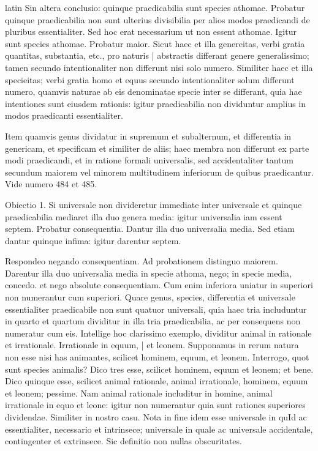\begin{otherlanguage*}{latin}
\pstart
  Sin altera conclusio: quinque praedicabilia sunt species athomae. Probatur quinque praedicabilia non sunt ulterius divisibilia per alios modos praedicandi de pluribus essentialiter. Sed hoc erat necessarium ut non essent athomae. Igitur sunt species athomae. Probatur maior. Sicut haec et illa genereitas, verbi gratia quantitas, substantia, etc., pro naturis \textnormal{|}   abstractis differant genere generalissimo; tamen secundo intentionaliter non differunt nisi solo numero. Similiter haec et illa specieitas; verbi gratia homo et equus secundo intentionaliter solum differunt numero, quamvis naturae ab eis denominatae specie inter se differant, quia hae intentiones sunt eiusdem rationis: igitur praedicabilia non dividuntur amplius in modos praedicanti essentialiter. 
\pend

\pstart
  Item quamvis genus dividatur in supremum et subalternum, et differentia in genericam, et specificam et similiter de aliis; haec membra non differunt ex parte modi praedicandi, et in ratione formali universalis, sed accidentaliter tantum secundum maiorem vel minorem multitudinem inferiorum de quibus praedicantur. Vide numero 484 et 485. 
\pend

\pstart
  Obiectio 1. Si universale non divideretur immediate inter universale et quinque praedicabilia mediaret illa duo genera media: igitur universalia iam essent septem. Probatur consequentia. Dantur illa duo universalia media. Sed etiam dantur quinque infima: igitur darentur septem. 
\pend

\pstart
  Respondeo negando consequentiam. Ad probationem distinguo maiorem. Darentur illa duo universalia media in specie athoma, nego; in specie  media, concedo. et nego absolute consequentiam. Cum enim inferiora uniatur in superiori non numerantur cum superiori. Quare genus, species, differentia et universale essentialiter praedicabile non sunt quatuor universali, quia haec tria includuntur in quarto et quartum dividitur in illa tria praedicabilia, ac per consequens non numeratur cum eis. Intellige hoc clarissimo exemplo, dividitur animal in rationale et irrationale. Irrationale in equum, \textnormal{|} et leonem. Supponamus in rerum natura non esse nisi has animantes, scilicet hominem, equum, et leonem. Interrogo, quot sunt species animalis? Dico tres esse, scilicet hominem, equum et leonem; et bene. Dico quinque esse, scilicet animal rationale, animal irrationale, hominem, equum et leonem; pessime. Nam animal rationale includitur in homine, animal irrationale in equo et leone: igitur non numerantur quia sunt rationes superiores dividendae. Similiter in nostro casu. Nota in fine idem esse universale in quId ac essentialiter, necessario et intrinsece; universale in quale ac universale accidentale, contingenter et extrinsece. Sic definitio non nullas obscuritates. 
\pend


\end{otherlanguage*}
